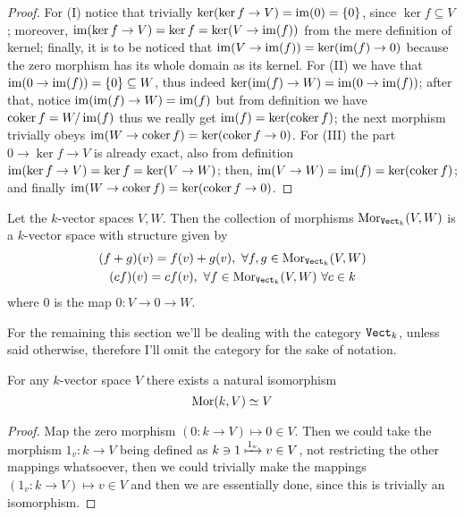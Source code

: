 \begin{proof}
    For (I) notice that trivially \(\ker(\ker f \to V) = \operatorname{im}(0) = \{0\}\), since
    \(\ker f \subseteq V\); moreover, \(\operatorname{im}(\ker f \to V) = \ker f = \ker(V \to
    \operatorname{im}(f))\) from the mere definition of kernel; finally, it is to be noticed
    that \(\operatorname{im}(V \to \operatorname{im}(f)) = \ker(\operatorname{im}(f) \to 0)\) because the zero morphism has
    its whole domain as its kernel.
    For (II) we have that \(\operatorname{im}(0 \to \operatorname{im}(f)) = \{0\} \subseteq W\), thus indeed
    \(\ker(\operatorname{im}(f) \to W) = \operatorname{im}(0 \to \operatorname{im}(f))\); after that, notice \(\operatorname{im}(\operatorname{im}(f)
    \to W) = \operatorname{im}(f)\) but from definition we have \(\operatorname{coker} f = W/\operatorname{im}(f)\) thus we
    really get \(\operatorname{im}(f) = \ker(\operatorname{coker} f)\); the next morphism trivially obeys
    \(\operatorname{im}(W \to \operatorname{coker} f) = \ker(\operatorname{coker} f \to 0)\).
    For (III) the part \(0 \to \ker f \to V\) is already exact, also from
    definition \(\operatorname{im}(\ker f \to V) = \ker f = \ker(V \to W)\); then, \(\operatorname{im}(V \to
    W) = \operatorname{im}(f) = \ker(\operatorname{coker} f)\); and finally  \(\operatorname{im}(W \to \operatorname{coker} f) =
    \ker(\operatorname{coker} f \to 0)\).
\end{proof}

\begin{definition}
    Let the \(k\)-vector spaces \(V, W\). Then the collection of morphisms
    \(\operatorname{Mor}_{{\texttt{Vect}}_k}(V, W)\) is a \(k\)-vector space with structure given by
    \begin{gather*}
        (f + g)(v) = f(v) + g(v),\ \forall f, g \in \operatorname{Mor}_{{\texttt{Vect}}_k}(V, W) \\
        (cf)(v) = c f(v),\ \forall f \in \operatorname{Mor}_{{\texttt{Vect}}_k}(V, W)\ \forall c \in k
    \end{gather*}
    where \(0\) is the map \(0 : V \to 0 \to W\).
\end{definition}

\begin{remark}
    For the remaining this section we'll be dealing with the category
    \({\texttt{Vect}}_k\), unless said otherwise, therefore I'll omit the
    category for the sake of notation.
\end{remark}

\begin{proposition}
    For any \(k\)-vector space \(V\) there exists a natural isomorphism
    \[
        \operatorname{Mor}(k, V) \simeq V
    \]
\end{proposition}

\begin{proof}
    Map the zero morphism \((0 : k \to V) \longmapsto 0 \in V\). Then we could take
    the morphism \(1_v : k \to V\) being defined as \(k \ni 1 \xmapsto{1_v} v \in
    V\), not restricting the other mappings whatsoever, then we could trivially
    make the mappings \((1_v : k \to V) \longmapsto v \in V\) and then we are
    essentially done, since this is trivially an isomorphism.
\end{proof}

